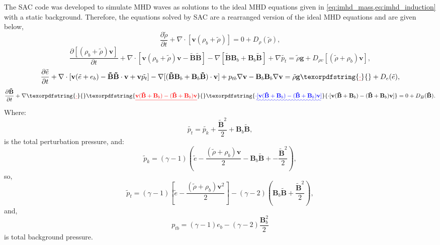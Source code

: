 \documentclass[a4paper,12pt,fourier,authoryear,custommargin]{Classes/PhDThesisPSnPDF}
\providecommand{\DIFaddtex}[1]{{\protect\color{blue}\uwave{#1}}} %
\providecommand{\DIFdeltex}[1]{{\protect\color{red}\sout{#1}}}                      %
\providecommand{\DIFaddbegin}{} %
\providecommand{\DIFaddend}{} %
\providecommand{\DIFdelbegin}{} %
\providecommand{\DIFdelend}{} %
\providecommand{\DIFadd}[1]{\texorpdfstring{\DIFaddtex{#1}}{#1}} %
\providecommand{\DIFdel}[1]{\texorpdfstring{\DIFdeltex{#1}}{}} %
\begin{document}
The SAC code was developed to simulate MHD waves as solutions to the ideal MHD equations given in \cref{eq:imhd_mass,eq:imhd_induction} with a static background.
Therefore, the equations solved by SAC are a rearranged version of the ideal MHD equations and are given below\DIFaddbegin \DIFadd{~}\DIFaddend \citep[taken from][]{shelyag2008},
\begin{equation}
\frac{\partial\tilde{\rho}}{\partial t}+\nabla\cdot[\mathbf{v}(\rho_{b}+\tilde{\rho})]=0+D_{\rho}(\tilde{\rho}),
\end{equation}
\begin{equation}
\frac{\partial[(\rho_{b}+\tilde{\rho})\mathbf{v}]}{\partial t}+\nabla\cdot[\mathbf{v}(\rho_{b}+\tilde{\rho})\mathbf{v}-\mathbf{\tilde{B}\tilde{B}}]-\nabla[\mathbf{\tilde{B}}\mathbf{B}_{b}+\mathbf{B}_{b}\mathbf{\tilde{B}}]+\nabla\tilde{p_{t}}=\tilde{\rho}\mathbf{g}+D_{\rho v}[(\tilde{\rho}+\rho_{b})\mathbf{v}],
\end{equation}
\begin{equation}
\frac{\partial\tilde{e}}{\partial t}+\nabla\cdot[\mathbf{v}(\tilde{e}+e_{b})-\mathbf{\tilde{B}\tilde{B}}\cdot\mathbf{v}+\mathbf{v}\tilde{p_{t}}]-\nabla[(\mathbf{\tilde{B}B}_{b}+\mathbf{B}_{b}\mathbf{\tilde{B}})\cdot\mathbf{v}]+p_{tb}\nabla\mathbf{v}-\mathbf{B}_{b}\mathbf{B}_{b}\nabla\mathbf{v}=\tilde{\rho}\mathbf{g}\DIFdelbegin \DIFdel{\cdot}\DIFdelend +D_{e}(\tilde{e}),
\end{equation}
\begin{equation}
\frac{\partial\mathbf{\tilde{B}}}{\partial t}+\nabla\DIFdelbegin \DIFdel{\cdot}%
\DIFdel{\mathbf{v}(\mathbf{\tilde{B}}+\mathbf{B}_{b})-(\mathbf{\tilde{B}}+\mathbf{B}_{b})\mathbf{v}}\DIFdelend \DIFaddbegin \DIFadd{\cdot[\mathbf{v}(\mathbf{\tilde{B}}+\mathbf{B}_{b})-(\mathbf{\tilde{B}}+\mathbf{B}_{b})\mathbf{v}]}\DIFaddend =0+D_{B}(\mathbf{\tilde{B}}).
\end{equation}
Where:
\begin{equation}
\tilde{p_{t}}=\tilde{p_{k}}+\frac{\tilde{\mathbf{B}}^{2}}{2}+\mathbf{B}_{b}\mathbf{\tilde{B}},
\end{equation}
is the total perturbation pressure, and: 
\begin{equation}
\tilde{p}_{k}=(\gamma-1)\left(\tilde{e}-\frac{(\tilde{\rho}+\rho_{b})\mathbf{v}}{2}-\mathbf{B}_b\mathbf{\tilde{B}}+-\frac{\tilde{\mathbf{B}}^{2}}{2}\right),
\end{equation}
so,
\begin{equation}
\tilde{p}_{t}=(\gamma-1)\left[\tilde{e}-\frac{(\tilde{\rho}+\rho_{b})\mathbf{v}^{2}}{2}\right]-(\gamma-2)\left(\mathbf{B}_{b}\mathbf{\tilde{B}}+\frac{\tilde{\mathbf{B}}^{2}}{2}\right),
\end{equation}
and,
\begin{equation}
p_{tb}=(\gamma-1)e_{b}-(\gamma-2)\frac{\mathbf{B}_{b}^{2}}{2}
\end{equation}
is total background pressure.
\end{document}
